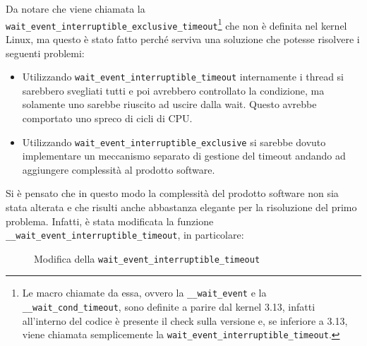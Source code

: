 \documentclass[oneside]{article}
\begin{document}
\begin{itemize}
\begin{itemize}
\begin{enumerate}
Da notare che viene chiamata la \texttt{wait\_event\_interruptible\_exclusive\_timeout}\footnote{Le macro chiamate da essa, ovvero la \texttt{\_\_wait\_event} e la \texttt{\_\_wait\_cond\_timeout}, sono definite a parire dal kernel 3.13, infatti all'interno del codice è presente il check sulla versione e, se inferiore a 3.13, viene chiamata semplicemente la \texttt{wait\_event\_interruptible\_timeout}.} che non è definita nel kernel Linux, ma questo è stato fatto perché serviva una soluzione che potesse risolvere i seguenti problemi:
\begin{itemize}
\item Utilizzando \texttt{wait\_event\_interruptible\_timeout} internamente i thread si sarebbero svegliati tutti e poi avrebbero controllato la condizione, ma solamente uno sarebbe riuscito ad uscire dalla wait. Questo avrebbe comportato uno spreco di cicli di CPU.
\item Utilizzando \texttt{wait\_event\_interruptible\_exclusive} si sarebbe dovuto implementare un meccanismo separato di gestione del timeout andando ad aggiungere complessità al prodotto software.
\end{itemize}
Si è pensato che in questo modo la complessità del prodotto software non sia stata alterata e che risulti anche abbastanza elegante per la risoluzione del primo problema. Infatti, è stata modificata la funzione \texttt{\_\_wait\_event\_interruptible\_timeout}, in particolare:
\begin{figure}[ht!]
\centering
{}
\caption{Modifica della \texttt{wait\_event\_interruptible\_timeout}}
\label{img:fig-wait}
\end{figure}


\end{enumerate}
\end{itemize}
\end{itemize}
\end{document}
